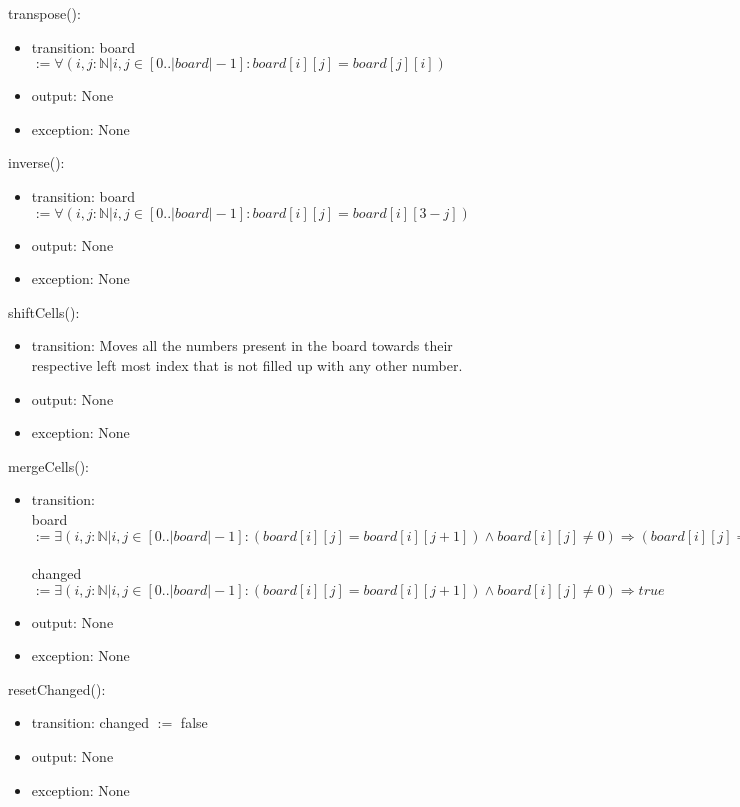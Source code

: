 \documentclass[12pt]{article}
\begin{document}
\noindent transpose():
\begin{itemize}
    \item transition: board $:= \forall (i, j: \mathbb{N} | i, j \in [0..|board|-1] : board[i][j] = board[j][i])$
    \item output: None 
    \item exception: None
\end{itemize}

\noindent inverse():
\begin{itemize}
    \item transition: board $:= \forall (i, j: \mathbb{N} | i, j \in [0..|board|-1] : board[i][j] = board[i][3-j])$
    \item output: None 
    \item exception: None
\end{itemize}

\noindent shiftCells():
\begin{itemize}
    \item transition: Moves all the numbers present in the board towards their respective left most index that is not filled up with any other number.
    \item output: None 
    \item exception: None
\end{itemize}

\noindent mergeCells():
\begin{itemize}
    \item transition: \\ board $:= \exists (i, j: \mathbb{N} | i, j \in [0..|board|-1] : (board[i][j] = board[i][j + 1]) \wedge board[i][j] \neq 0) \Rightarrow (board[i][j] = board[i][j] * 2) \wedge (board[i][j + 1] = 0))$ \\\\
    changed $:= \exists (i, j: \mathbb{N} | i, j \in [0..|board|-1] : (board[i][j] = board[i][j + 1]) \wedge board[i][j] \neq 0) \Rightarrow true$
    \item output: None 
    \item exception: None
\end{itemize}

\noindent resetChanged():
\begin{itemize}
    \item transition: changed $:=$ false
    \item output: None 
    \item exception: None
\end{itemize}
\end{document}
